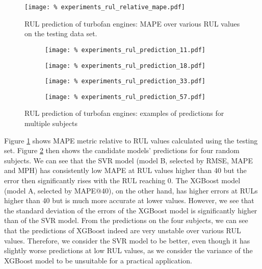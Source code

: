 \begin{figure}
	\centering
    \texttt{[image: \%
        experiments\_rul\_relative\_mape.pdf]}
	\caption{RUL prediction of turbofan engines: MAPE over various RUL values on the testing data set.}
	\label{fig:experiments_rul_relative_mape}
\end{figure}

\begin{figure}
    \centering
    \begin{subfigure}{.49\textwidth}
        \texttt{[image: \%
            experiments\_rul\_prediction\_11.pdf]}
    \end{subfigure}
    \begin{subfigure}{.49\textwidth}
        \texttt{[image: \%
            experiments\_rul\_prediction\_18.pdf]}
    \end{subfigure}
    \begin{subfigure}{.49\textwidth}
        \texttt{[image: \%
            experiments\_rul\_prediction\_33.pdf]}
    \end{subfigure}
    \begin{subfigure}{.49\textwidth}
        \texttt{[image: \%
            experiments\_rul\_prediction\_57.pdf]}
    \end{subfigure}
    \caption{RUL prediction of turbofan engines: examples of predictions for multiple subjects}
    \label{fig:experiments_rul_prediction}
\end{figure}

Figure \ref{fig:experiments_rul_relative_mape} shows MAPE metric relative to RUL values calculated using the testing set.
Figure \ref{fig:experiments_rul_prediction} then shows the candidate models' predictions for four random subjects.
We can see that the SVR model (model B, selected by RMSE, MAPE and MPH) has consistently low MAPE at RUL values higher than 40 but the error then significantly rises with the RUL reaching 0.
The XGBoost model (model A, selected by MAPE@40), on the other hand, has higher errors at RULs higher than 40 but is much more accurate at lower values.
However, we see that the standard deviation of the errors of the XGBoost model is significantly higher than of the SVR model.
From the predictions on the four subjects, we can see that the predictions of XGBoost indeed are very unstable over various RUL values.
Therefore, we consider the SVR model to be better, even though it has slightly worse predictions at low RUL values, as we consider the variance of the XGBoost model to be unsuitable for a practical application.

